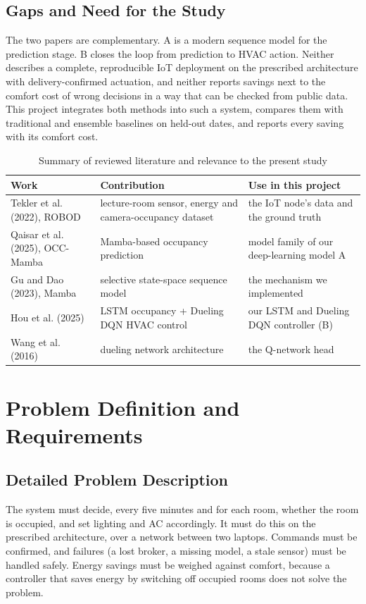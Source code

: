 \documentclass[12pt,a4paper,oneside]{report}
\begin{document}
\section{Gaps and Need for the Study}
The two papers are complementary. A is a modern sequence model for the prediction stage. B closes the loop from
prediction to HVAC action. Neither describes a complete, reproducible IoT deployment on the prescribed architecture
with delivery-confirmed actuation, and neither reports savings next to the comfort cost of wrong decisions in a way
that can be checked from public data. This project integrates both methods into such a system, compares them with
traditional and ensemble baselines on held-out dates, and reports every saving with its comfort cost.

\begin{table}[H]
\centering
\caption{Summary of reviewed literature and relevance to the present study}
\label{tab:lit}
\begin{tabularx}{\textwidth}{@{}L{3.6cm}YY@{}}
\toprule
\textbf{Work} & \textbf{Contribution} & \textbf{Use in this project}\\
\midrule
Tekler et al. (2022), ROBOD & lecture-room sensor, energy and camera-occupancy dataset & the IoT node's data and the ground truth\\
Qaisar et al. (2025), OCC-Mamba & Mamba-based occupancy prediction & model family of our deep-learning model A\\
Gu and Dao (2023), Mamba & selective state-space sequence model & the mechanism we implemented\\
Hou et al. (2025) & LSTM occupancy + Dueling DQN HVAC control & our LSTM and Dueling DQN controller (B)\\
Wang et al. (2016) & dueling network architecture & the Q-network head\\
\bottomrule
\end{tabularx}
\end{table}

\chapter{Problem Definition and Requirements}\label{ch:req}

\section{Detailed Problem Description}
The system must decide, every five minutes and for each room, whether the room is occupied, and set lighting and AC
accordingly. It must do this on the prescribed architecture, over a network between two laptops. Commands must be
confirmed, and failures (a lost broker, a missing model, a stale sensor) must be handled safely. Energy savings must
be weighed against comfort, because a controller that saves energy by switching off occupied rooms does not solve
the problem.
\end{document}
